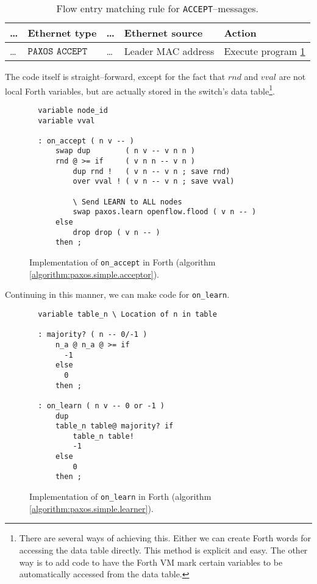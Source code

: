 \begin{table}[H]
  \begin{tabular}{l|l|l|l|l|}
    \hline
      \dots &
      \textbf{Ethernet type} &
      \dots &
      \textbf{Ethernet source} &
      \textbf{Action}
      \\
    \hline
      \dots &
      $\texttt{PAXOS ACCEPT}$
      & \dots
      & Leader MAC address
      & Execute program \ref{program:forth.on-accept}
      \\
    \hline
  \end{tabular}
  \caption{Flow entry matching rule for \texttt{ACCEPT}--messages.}
  \label{table:matching.simple.accept}
\end{table}

The code itself is straight--forward, except for the fact that $rnd$ and
$vval$ are not local Forth variables, but are actually stored in the
switch's data table\footnote{There are several ways of achieving this.
Either we can create Forth words for accessing the data table directly.
This method is explicit and easy.  The other way is to add code to have
the Forth VM mark certain variables to be automatically accessed from the
data table.}.

\begin{figure}[H]
  \centering
  \begin{Verbatim}
  variable node_id
  variable vval

  : on_accept ( n v -- )
      swap dup        ( n v -- v n n )
      rnd @ >= if     ( v n n -- v n )
          dup rnd !   ( v n -- v n ; save rnd)
          over vval ! ( v n -- v n ; save vval)

          \ Send LEARN to ALL nodes
          swap paxos.learn openflow.flood ( v n -- )
      else
          drop drop ( v n -- )
      then ;
  \end{Verbatim}
  \caption{Implementation of \texttt{on\_{}accept} in Forth
            (algorithm \ref{algorithm:paxos.simple.acceptor}).}
  \label{program:forth.on-accept}
\end{figure}

Continuing in this manner, we can make code for \texttt{on\_{}learn}.

\begin{figure}[H]
  \centering
  \begin{Verbatim}
  variable table_n \ Location of n in table

  : majority? ( n -- 0/-1 )
      n_a @ n_a @ >= if
        -1
      else
        0
      then ;

  : on_learn ( n v -- 0 or -1 )
      dup
      table_n table@ majority? if
          table_n table!
          -1
      else
          0
      then ;
  \end{Verbatim}
  \caption{Implementation of \texttt{on\_{}learn} in Forth (algorithm \ref{algorithm:paxos.simple.learner}).}
  \label{program:forth.on-learn}
\end{figure}

